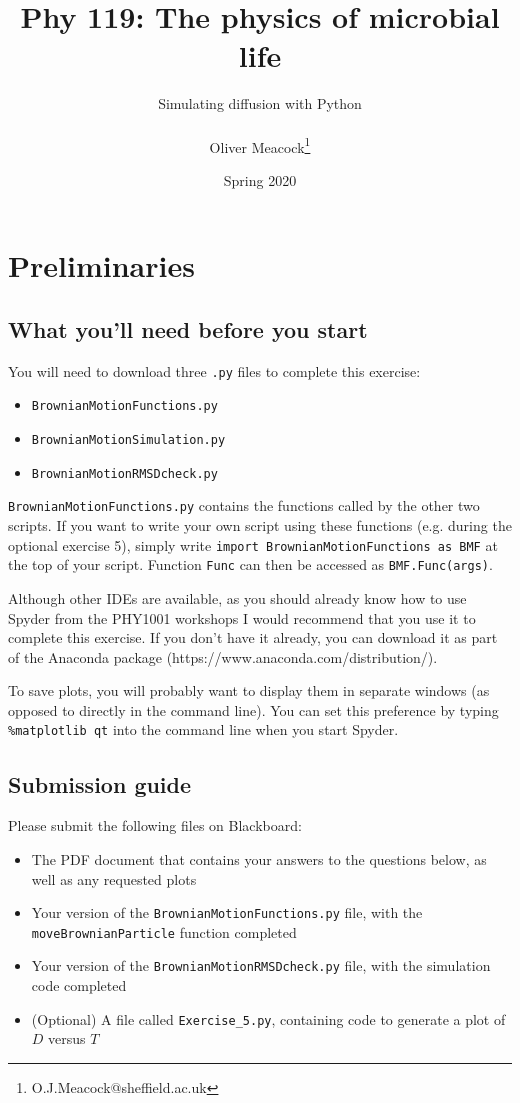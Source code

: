 \documentclass[11pt, oneside]{article}
\title{Phy 119: The physics of microbial life}
\author{Simulating diffusion with Python\\ \: \\ Oliver Meacock\thanks{O.J.Meacock@sheffield.ac.uk}}
\date{Spring 2020}
\begin{document}
	
	\maketitle
	
	\section{Preliminaries}
	
	\subsection{What you'll need before you start}
	
	You will need to download three \texttt{.py} files to complete this exercise:
	
	\begin{itemize}
		\item \texttt{BrownianMotionFunctions.py}
		\item \texttt{BrownianMotionSimulation.py}
		\item \texttt{BrownianMotionRMSDcheck.py}
	\end{itemize}
	
	\texttt{BrownianMotionFunctions.py} contains the functions called by the other two scripts. If you want to write your own script using these functions (e.g. during the optional exercise 5), simply write \texttt{import BrownianMotionFunctions as BMF} at the top of your script. Function \texttt{Func} can then be accessed as \texttt{BMF.Func(args)}. 
	
	Although other IDEs are available, as you should already know how to use Spyder from the PHY1001 workshops I would recommend that you use it to complete this exercise. If you don't have it already, you can download it as part of the Anaconda package (https://www.anaconda.com/distribution/).
	
	To save plots, you will probably want to display them in separate windows (as opposed to directly in the command line). You can set this preference by typing \texttt{\%matplotlib qt} into the command line when you start Spyder.
	
	\subsection{Submission guide}
	
	Please submit the following files on Blackboard:
	
	\begin{itemize}
		\item The PDF document that contains your answers to the questions below, as well as any requested plots
		\item Your version of the \texttt{BrownianMotionFunctions.py} file, with the \texttt{moveBrownianParticle} function completed
		\item Your version of the \texttt{BrownianMotionRMSDcheck.py} file, with the simulation code completed
		\item (Optional) A file called \texttt{Exercise\_5.py}, containing code to generate a plot of $D$ versus $T$
	\end{itemize}
	
\end{document}
